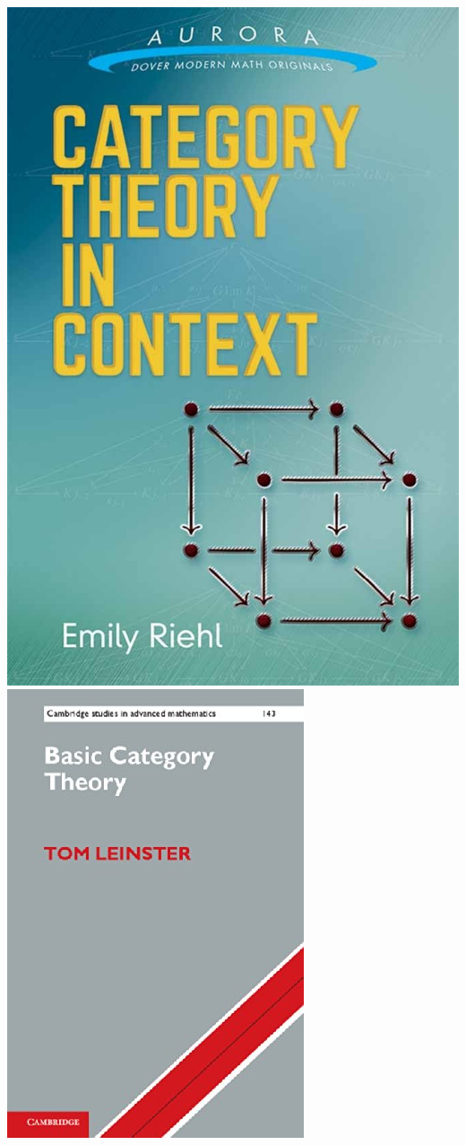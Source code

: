 \documentclass{beamer}
\begin{document}
\begin{frame}
\hfill
\includegraphics[scale=0.2]{riehl.jpg}
\hfill
\includegraphics[scale=0.4]{leinster.jpg}
\hfill~
\end{frame}
\begin{frame}


\end{frame}
\end{document}
